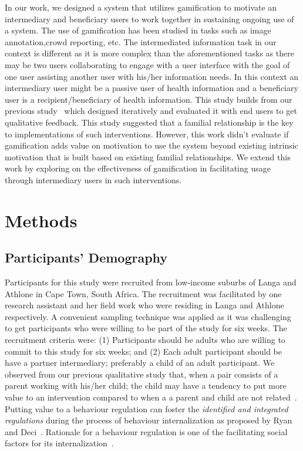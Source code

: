 \documentclass{sig-alternate}
\begin{document}
In our work, we designed a system that  utilizes gamification to motivate an intermediary and beneficiary users to work together in sustaining ongoing use of a system. The use of gamification has been studied in tasks such as image annotation\cite{mekler2013:disassembling},crowd reporting\cite{crowley2012:gamification}, etc. The intermediated information task in our context is different as it is more complex than the aforementioned tasks as there may be two users collaborating to engage with a user interface with the goal of one user assisting another user with his/her information needs. In this context an intermediary  user might be a passive user of health information and a beneficiary user is a recipient/beneficiary of health information. This study builds from our previous study~\cite{katule2016:leveraging} which designed iteratively and evaluated it with end users to get qualitative feedback. This study suggested that a familial relationship is the key to implementations of such interventions. However, this work didn't evaluate if gamification adds value on motivation to use the system beyond existing intrinsic motivation that is built based on existing familial relationships. We extend this work by exploring on the effectiveness of gamification in facilitating usage through intermediary users in such interventions.
\section{Methods}
\subsection{Participants' Demography}
Participants for this study were recruited from low-income suburbs of Langa and Athlone in Cape Town, South Africa. The recruitment was facilitated by one research assistant and her field work who were residing in Langa and Athlone respectively. A convenient sampling technique was applied as it was challenging to get participants who were willing to be part of the study for six weeks.  The recruitment criteria were: (1) Participants should be adults who are willing to commit to this study for six weeks; and (2) Each adult participant should be have a partner intermediary; preferably a child of an adult participant. We observed from our previous qualitative study that, when a pair consists of a parent working with his/her child; the child may have a tendency to put more value to an intervention compared to when a a parent and child are not related~\cite{katule2016:leveraging}. Putting value to a behaviour regulation can foster the \emph{identified and integrated regulations} during the process of behaviour internalization as proposed by Ryan and Deci~\cite{ryan2000intrinsic}. Rationale for a behaviour regulation is one of the facilitating social factors for  its internalization~\cite{deci1994facilitating}. 
\end{document}
